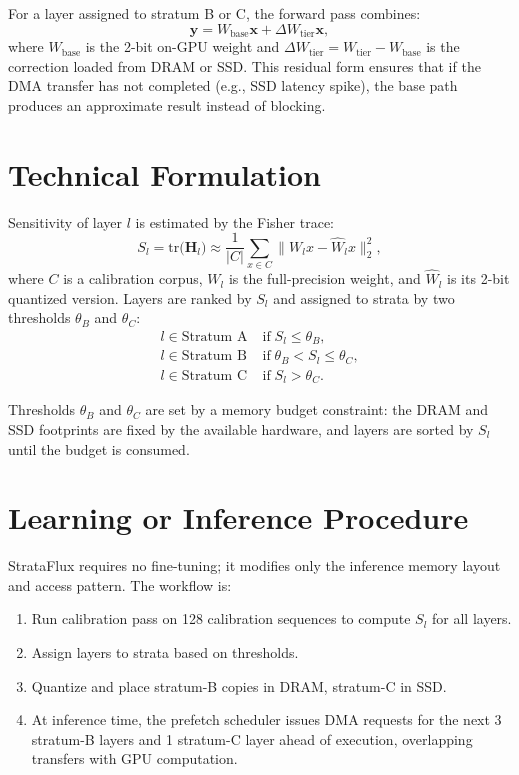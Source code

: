 \documentclass[10pt,twocolumn]{article}
\begin{document}
For a layer assigned to stratum B or C, the forward pass combines:
\[
  \mathbf{y} = W_{\text{base}} \mathbf{x}
    + \Delta W_{\text{tier}} \mathbf{x},
\]
where $W_{\text{base}}$ is the 2-bit on-GPU weight and
$\Delta W_{\text{tier}} = W_{\text{tier}} - W_{\text{base}}$ is the
correction loaded from DRAM or SSD. This residual form ensures that
if the DMA transfer has not completed (e.g., SSD latency spike), the
base path produces an approximate result instead of blocking.

\section{Technical Formulation}

Sensitivity of layer $l$ is estimated by the Fisher trace:
\[
  S_l = \mathrm{tr}\bigl(\mathbf{H}_l\bigr)
    \approx \frac{1}{|C|} \sum_{x \in C}
    \bigl\|W_l x - \hat{W}_l x\bigr\|_2^2,
\]
where $C$ is a calibration corpus, $W_l$ is the full-precision weight,
and $\hat{W}_l$ is its 2-bit quantized version. Layers are ranked by
$S_l$ and assigned to strata by two thresholds $\theta_B$ and
$\theta_C$:
\begin{align*}
  l \in \text{Stratum A} &\;\text{if}\; S_l \le \theta_B,\\
  l \in \text{Stratum B} &\;\text{if}\; \theta_B < S_l \le \theta_C,\\
  l \in \text{Stratum C} &\;\text{if}\; S_l > \theta_C.
\end{align*}

Thresholds $\theta_B$ and $\theta_C$ are set by a memory budget
constraint: the DRAM and SSD footprints are fixed by the available
hardware, and layers are sorted by $S_l$ until the budget is consumed.

\section{Learning or Inference Procedure}

StrataFlux requires no fine-tuning; it modifies only the inference
memory layout and access pattern. The workflow is:
\begin{enumerate}[itemsep=2pt,parsep=0pt]
  \item Run calibration pass on 128 calibration sequences to compute
    $S_l$ for all layers.
  \item Assign layers to strata based on thresholds.
  \item Quantize and place stratum-B copies in DRAM, stratum-C in SSD.
  \item At inference time, the prefetch scheduler issues DMA requests
    for the next 3 stratum-B layers and 1 stratum-C layer ahead of
    execution, overlapping transfers with GPU computation.
\end{enumerate}
\end{document}
